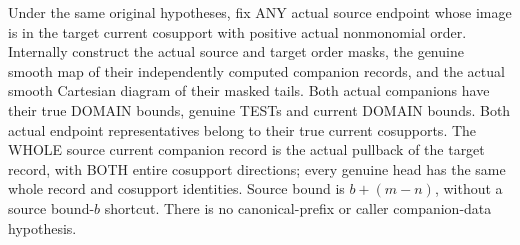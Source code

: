 \begin{theorem}
\label{hir:original-finite-order-cut-current-smooth-companions}
\leanok
Under the same original hypotheses, fix ANY actual source endpoint whose
image is in the target current cosupport with positive actual nonmonomial
order. Internally construct the actual source and target order masks,
the genuine smooth map of their independently computed companion records,
and the actual smooth Cartesian diagram of their masked tails. Both actual
companions have their true DOMAIN bounds, genuine TESTs and current DOMAIN
bounds. Both actual endpoint representatives belong to their true current
cosupports. The WHOLE source current companion record is the actual
pullback of the target record, with BOTH entire cosupport directions;
every genuine head has the same whole record and cosupport identities.
Source bound is $b+(m-n)$, without a source bound-$b$ shortcut.
There is no canonical-prefix or caller companion-data hypothesis.
\end{theorem}
